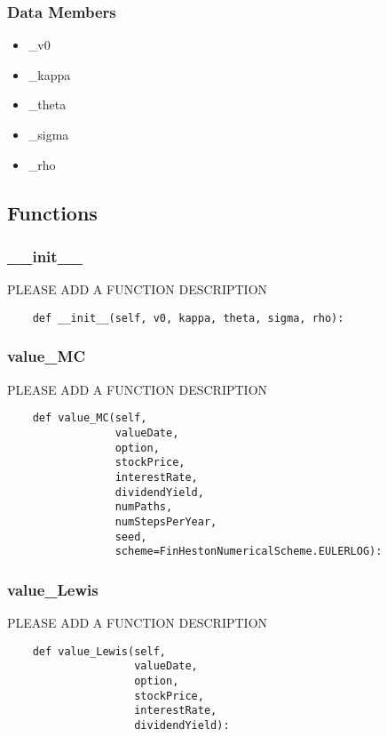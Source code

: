 \documentclass[twoside,11pt]{book}
\begin{document}
\subsubsection*{Data Members}
\begin{itemize}
\item{\_v0}
\item{\_kappa}
\item{\_theta}
\item{\_sigma}
\item{\_rho}
\end{itemize}

\subsection*{Functions}

\subsubsection*{{\bf \_\_init\_\_}}
PLEASE ADD A FUNCTION DESCRIPTION

\begin{lstlisting}
    def __init__(self, v0, kappa, theta, sigma, rho):
\end{lstlisting}

\subsubsection*{{\bf value\_MC}}
PLEASE ADD A FUNCTION DESCRIPTION

\begin{lstlisting}
    def value_MC(self,
                 valueDate,
                 option,
                 stockPrice,
                 interestRate,
                 dividendYield,
                 numPaths,
                 numStepsPerYear,
                 seed,
                 scheme=FinHestonNumericalScheme.EULERLOG):
\end{lstlisting}

\subsubsection*{{\bf value\_Lewis}}
PLEASE ADD A FUNCTION DESCRIPTION

\begin{lstlisting}
    def value_Lewis(self,
                    valueDate,
                    option,
                    stockPrice,
                    interestRate,
                    dividendYield):
\end{lstlisting}
\end{document}
